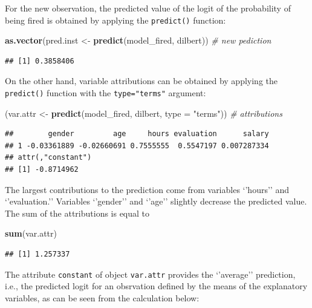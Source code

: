 \documentclass[12pt,]{krantz}
\newenvironment{Shaded}{\begin{snugshade}}{\end{snugshade}}
\newcommand{\CommentTok}[1]{\textcolor[rgb]{0.56,0.35,0.01}{\textit{#1}}}
\newcommand{\DataTypeTok}[1]{\textcolor[rgb]{0.13,0.29,0.53}{#1}}
\newcommand{\KeywordTok}[1]{\textcolor[rgb]{0.13,0.29,0.53}{\textbf{#1}}}
\newcommand{\NormalTok}[1]{#1}
\newcommand{\StringTok}[1]{\textcolor[rgb]{0.31,0.60,0.02}{#1}}
\theoremstyle{definition}
\theoremstyle{definition}
\theoremstyle{definition}
\theoremstyle{remark}
\begin{document}
For the new observation, the predicted value of the logit of the
probability of being fired is obtained by applying the
\texttt{predict()} function:

\begin{Shaded}
\begin{Highlighting}[]
\KeywordTok{as.vector}\NormalTok{(pred.inst <-}\StringTok{ }\KeywordTok{predict}\NormalTok{(model_fired, dilbert)) }\CommentTok{# new pediction}
\end{Highlighting}
\end{Shaded}

\begin{verbatim}
## [1] 0.3858406
\end{verbatim}

On the other hand, variable attributions can be obtained by applying the
\texttt{predict()} function with the \texttt{type="terms"} argument:

\begin{Shaded}
\begin{Highlighting}[]
\NormalTok{(var.attr <-}\StringTok{ }\KeywordTok{predict}\NormalTok{(model_fired, dilbert, }\DataTypeTok{type =} \StringTok{"terms"}\NormalTok{)) }\CommentTok{# attributions}
\end{Highlighting}
\end{Shaded}

\begin{verbatim}
##        gender         age     hours evaluation      salary
## 1 -0.03361889 -0.02660691 0.7555555  0.5547197 0.007287334
## attr(,"constant")
## [1] -0.8714962
\end{verbatim}

The largest contributions to the prediction come from variables
`'hours'' and `'evaluation.'' Variables `'gender'' and `'age'' slightly
decrease the predicted value. The sum of the attributions is equal to

\begin{Shaded}
\begin{Highlighting}[]
\KeywordTok{sum}\NormalTok{(var.attr)}
\end{Highlighting}
\end{Shaded}

\begin{verbatim}
## [1] 1.257337
\end{verbatim}

The attribute \texttt{constant} of object \texttt{var.attr} provides the
`'average'' prediction, i.e., the predicted logit for an obsrvation
defined by the means of the explanatory variables, as can be seen from
the calculation below:
\end{document}
